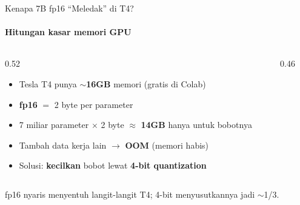 \documentclass[aspectratio=169,t]{beamer}
\begin{document}
\begin{frame}{Kenapa 7B fp16 ``Meledak'' di T4?}
  \framesubtitle{Hitungan kasar memori GPU}
  \begin{columns}[T]
    \begin{column}{0.52\textwidth}
      \begin{itemize}
        \footnotesize
        \item Tesla T4 punya \textbf{$\sim$16GB} memori (gratis di Colab)
        \item \textbf{fp16} $=$ 2 byte per parameter
        \item 7 miliar parameter $\times$ 2 byte $\approx$ \textbf{14GB} hanya untuk bobotnya
        \item Tambah data kerja lain $\to$ \textbf{OOM} (memori habis)
        \item Solusi: \textbf{kecilkan} bobot lewat \textbf{4-bit quantization}
      \end{itemize}
    \end{column}
    \begin{column}{0.46\textwidth}
      \centering
    \end{column}
  \end{columns}
  \vspace{0.2em}
  \begin{center}
    \textcolor{nvlightgreen}{\small fp16 nyaris menyentuh langit-langit T4; 4-bit menyusutkannya jadi $\sim$1/3.}
  \end{center}
\end{frame}
\end{document}
